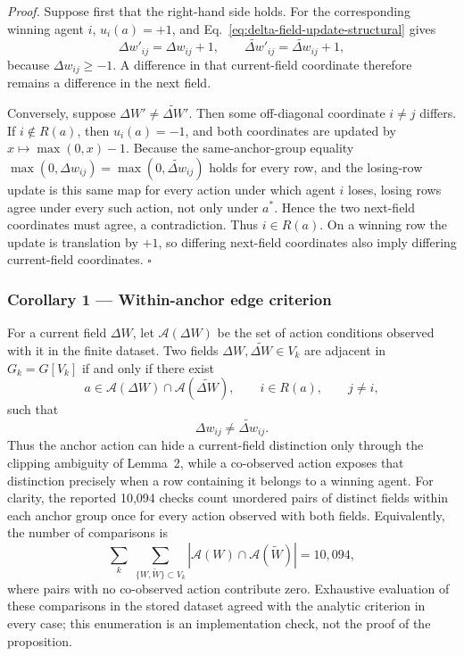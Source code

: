 \documentclass[
  11pt,
]{article}
\begin{document}
\emph{Proof.}
Suppose first that the right-hand side holds.  For the corresponding
winning agent \(i\), \(u_i(a)=+1\), and
Eq.~\eqref{eq:delta-field-update-structural} gives
\[
 \Delta w'_{ij}=\Delta w_{ij}+1,\qquad
 \widetilde{\Delta w}'_{ij}=\widetilde{\Delta w}_{ij}+1,
\]
because \(\Delta w_{ij}\ge-1\).  A difference in that current-field
coordinate therefore remains a difference in the next field.

Conversely, suppose \(\Delta W'\neq\widetilde{\Delta W}'\).  Then some
off-diagonal coordinate \(i\neq j\) differs.  If \(i\notin R(a)\), then
\(u_i(a)=-1\), and both coordinates are updated by
\(x\mapsto\max(0,x)-1\). Because the same-anchor-group equality
\(\max(0,\Delta w_{ij})=\max(0,\widetilde{\Delta w}_{ij})\) holds for
every row, and the losing-row update is this same map for every action
under which agent \(i\) loses, losing rows agree under every such
action, not only under \(a^\ast\). Hence the two next-field coordinates
must agree, a contradiction.  Thus \(i\in R(a)\).  On a winning row
the update is translation by \(+1\), so differing next-field coordinates
also imply differing current-field coordinates. \(\square\)

\subsubsection{Corollary 1 --- Within-anchor edge criterion}\label{cor-within-anchor-edge}

For a current field \(\Delta W\), let \(\mathcal A(\Delta W)\) be the
set of action conditions observed with it in the finite dataset.  Two
fields \(\Delta W,\widetilde{\Delta W}\in V_k\) are adjacent in
\(G_k=G[V_k]\) if and only if there exist
\[
 a\in\mathcal A(\Delta W)\cap\mathcal A(\widetilde{\Delta W}),
 \qquad i\in R(a),\qquad j\neq i,
\]
such that
\[
 \Delta w_{ij}\neq\widetilde{\Delta w}_{ij}.
 \tag{21}\label{eq:within-anchor-edge-criterion}
\]
Thus the anchor action can hide a current-field distinction only through
the clipping ambiguity of Lemma~2, while a co-observed action exposes
that distinction precisely when a row containing it belongs to a winning
agent.  For clarity, the reported 10,094 checks count unordered pairs
of distinct fields within each anchor group once for every action observed
with both fields.  Equivalently, the number of comparisons is
\[
 \sum_k\;\sum_{\{W,\widetilde W\}\subset V_k}
 \left|\mathcal A(W)\cap\mathcal A(\widetilde W)\right|=10{,}094,
 \tag{22}\label{eq:10094-check-count}
\]
where pairs with no co-observed action contribute zero. Exhaustive
evaluation of these comparisons in the stored dataset agreed with the
analytic criterion in every case; this enumeration is an implementation
check, not the proof of the proposition.
\end{document}
